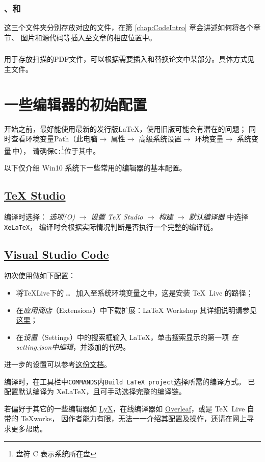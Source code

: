 \subsubsection{、和}
这三个文件夹分别存放对应的文件，在第 \ref{chap:CodeIntro} 章会讲述如何将各个章节、
图片和源代码等插入至文章的相应位置中。
\subsubsection{}
用于存放扫描的PDF文件，可以根据需要插入和替换论文中某部分。具体方式见主文件。

\section{一些编辑器的初始配置}
开始之前，最好能使用最新的发行版\LaTeX{}，使用旧版可能会有潜在的问题；
同时查看环境变量Path（此电脑$\to$ 属性$\to$ 高级系统设置$\to$
环境变量$\to$ 系统变量\,中），
请确保\texttt{C:}\footnote{盘符 C 表示系统所在盘}位于其中。

以下仅介绍 Win10 系统下一些常用的编辑器的基本配置。
\subsection{\href{http://texstudio.sourceforge.net}{\TeX{} Studio}}
编译时选择\XeLaTeX{}：
\emph{选项(O)} $\to$ \emph{设置 TeX Studio} $\to$
\emph{构建} $\to$ \emph{默认编译器} 中选择\texttt{XeLaTeX}，
编译时会根据实际情况判断是否执行一个完整的编译链。

\subsection{\href{https://code.visualstudio.com}{Visual Studio Code}}
初次使用做如下配置：
\begin{itemize}
	\item 将\TeX{}Live下的 \texttt{\dots {}%
			} 加入至系统环境变量之中，这是安装 \TeX\ Live 的路径；
	\item 在\emph{应用商店}（Extensions）中下载扩展：\textsf{LaTeX Workshop}
			其详细说明请参见\href{https://github.com/James-Yu/LaTeX-Workshop}{这里}；%
	\item 在\emph{设置}（Settings）中的搜索框输入 LaTeX，单击搜索显示的第一项
			\emph{在setting.json中编辑}，并添加的代码。
\end{itemize}
进一步的设置可以参考\href{https://github.com/EthanDeng/vscode-latex/}{这份文档}。

编译时，在工具栏中\texttt{COMMANDS}内\texttt{Build LaTeX project}选择所需的编译方式。
已配置默认编译为 XeLaTeX，且可手动选择完整的编译链。

若偏好于其它的一些编辑器如 \href{http://www.lyx.org/}{LyX}，在线编译器如
\href{https://www.overleaf.com/}{Overleaf}，或是 \TeX\ Live 自带的 TeXworks，
因作者能力有限，无法一一介绍其配置及操作，还请在网上寻求更多帮助。